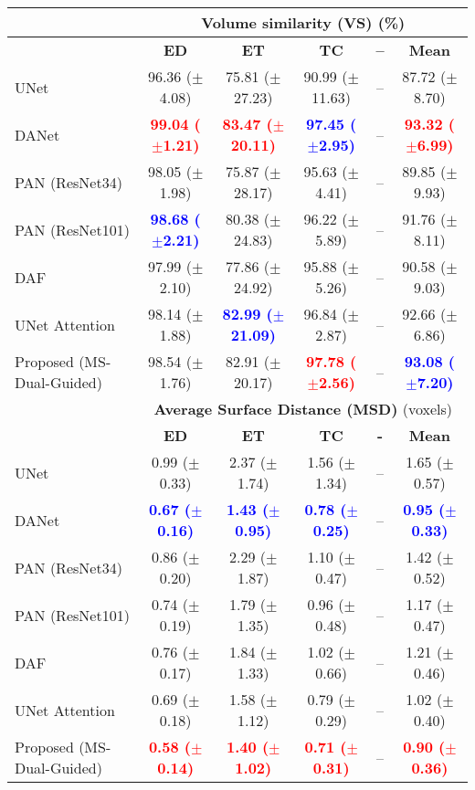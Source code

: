 \documentclass[journal]{IEEEtran}
\begin{document}
\begin{table*}[t!]
\begin{tabular}{lcccc|c}
\midrule
& \multicolumn{5}{c}{\textbf{Volume similarity (VS)} (\%)}\\
 \midrule
 & \textbf{ED} & \textbf{ET} & \textbf{TC} & \textbf{--} & \textbf{Mean}  \\
 \midrule
UNet \cite{ronneberger2015u}  &  96.36 ($\pm$4.08)& 75.81 ($\pm$27.23)& 90.99  ($\pm$11.63)& --& 87.72 ($\pm$8.70)\\
DANet \cite{fu2018dual}  &  \textcolor{red}{\textbf{99.04 ($\pm$1.21)}} & \textcolor{red}{\textbf{83.47 ($\pm$20.11)}}& \textcolor{blue}{\textbf{97.45 ($\pm$2.95)}} & --& \textcolor{red}{\textbf{93.32 ($\pm$6.99)}}  \\
PAN (ResNet34) \cite{li2018pyramid}   &  98.05 ($\pm$1.98)& 75.87 ($\pm$28.17)& 95.63 ($\pm$4.41)& -- & 89.85 ($\pm$9.93)  \\
PAN (ResNet101) \cite{li2018pyramid}   &  \textcolor{blue}{\textbf{98.68 ($\pm$2.21)}} & 80.38 ($\pm$24.83)& 96.22 ($\pm$5.89) & -- & 91.76 ($\pm$8.11)\\
DAF \cite{wang18d}  &  97.99 ($\pm$2.10) & 77.86 ($\pm$24.92) & 95.88 ($\pm$5.26) & -- &   90.58 ($\pm$9.03)  \\
UNet Attention \cite{schlemper2019attention}  &   98.14 ($\pm$1.88) & \textcolor{blue}{\textbf{82.99 ($\pm$21.09)}}& 96.84 ($\pm$2.87) & -- &  92.66 ($\pm$6.86)  \\
Proposed (MS-Dual-Guided)  & 98.54 ($\pm$1.76) & 82.91 ($\pm$20.17) &  \textcolor{red}{\textbf{97.78 ($\pm$2.56)}} &-- & \textcolor{blue}{\textbf{93.08 ($\pm$7.20)}} \\
\midrule
& \multicolumn{5}{c}{\textbf{Average Surface Distance (MSD)} (voxels)}\\
 \midrule
 & \textbf{ED} & \textbf{ET} & \textbf{TC} & \textbf{-} & \textbf{Mean}  \\
 \midrule
UNet \cite{ronneberger2015u}  & 0.99 ($\pm$0.33)& 2.37 ($\pm$1.74)& 1.56 ($\pm$1.34)& -- & 1.65 ($\pm$0.57) \\
DANet \cite{fu2018dual}  &  \textcolor{blue}{\textbf{0.67 ($\pm$0.16)}} & \textcolor{blue}{\textbf{1.43 ($\pm$0.95)}}& \textcolor{blue}{\textbf{0.78 ($\pm$0.25)}} & -- & \textcolor{blue}{\textbf{0.95  ($\pm$0.33)}}   \\
PAN (ResNet34)\cite{li2018pyramid}   & 0.86 ($\pm$0.20)  & 2.29 ($\pm$1.87) & 1.10 ($\pm$0.47) & -- & 1.42 ($\pm$0.52) \\
PAN (ResNet101) \cite{li2018pyramid}   & 0.74 ($\pm$0.19)  & 1.79 ($\pm$1.35) & 0.96 ($\pm$0.48) & -- & 1.17 ($\pm$0.47) \\
DAF \cite{wang18d}  & 0.76 ($\pm$0.17) & 1.84 ($\pm$1.33) & 1.02 ($\pm$0.66)& -- &  1.21 ($\pm$0.46)  \\
UNet Attention \cite{schlemper2019attention}  & 0.69 ($\pm$0.18) & 1.58 ($\pm$1.12) &  0.79 ($\pm$0.29) & --&  1.02 ($\pm$0.40)  \\
Proposed (MS-Dual-Guided)  & \textcolor{red}{\textbf{0.58 ($\pm$0.14)}}  & \textcolor{red}{\textbf{1.40 ($\pm$1.02)}}&  \textcolor{red}{\textbf{0.71 ($\pm$0.31)}} & -- &  \textcolor{red}{\textbf{0.90 ($\pm$0.36)}} \\
\midrule
\midrule
\end{tabular}


\end{table*}
\end{document}
